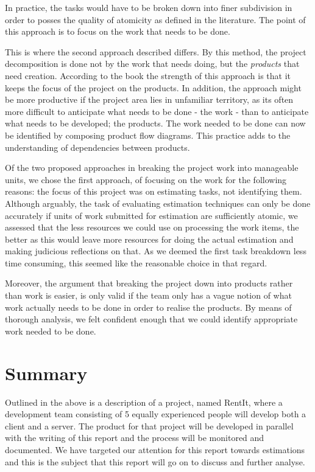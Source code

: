 In practice, the tasks would have to be broken down into finer subdivision in order to posses the quality of atomicity as defined in the literature. The point of this approach is to focus on the work that needs to be done.

This is where the second approach described differs. By this method, the project decomposition is done not by the work that needs doing, but the \textit{products}  that need creation. According to the book the strength of this approach is that it keeps the focus of the project on the products. In addition, the approach might be more productive if the project area lies in unfamiliar territory, as its often more difficult to anticipate what needs to be done - the work - than to anticipate what needs to be developed; the products. The work needed to be done can now be identified by composing product flow diagrams. This practice adds to the understanding of dependencies between products.

Of the two proposed approaches in breaking the project work into manageable units, we chose the first approach, of focusing on the work for the following reasons: the focus of this project was on estimating tasks, not identifying them. Although arguably, the task of evaluating estimation techniques can only be done accurately if units of work submitted for estimation are sufficiently atomic, we assessed that the less resources we could use on processing the work items, the better as this would leave more resources for doing the actual estimation and making judicious reflections on that. As we deemed the first task breakdown less time consuming, this seemed like the reasonable choice in that regard.

Moreover, the argument that breaking the project down into products rather than work is easier, is only valid if the team only has a vague notion of what work actually needs to be done in order to realise the products. By means of thorough analysis, we felt confident enough that we could identify appropriate work needed to be done.


\section{Summary}
Outlined in the above is a description of a project, named RentIt, where a development team consisting of 5 equally experienced people will develop both a client and a server. The product for that project will be developed in parallel with the writing of this report and the process will be monitored and documented. We have targeted our attention for this report towards estimations and this is the subject that this report will go on to discuss and further analyse.

